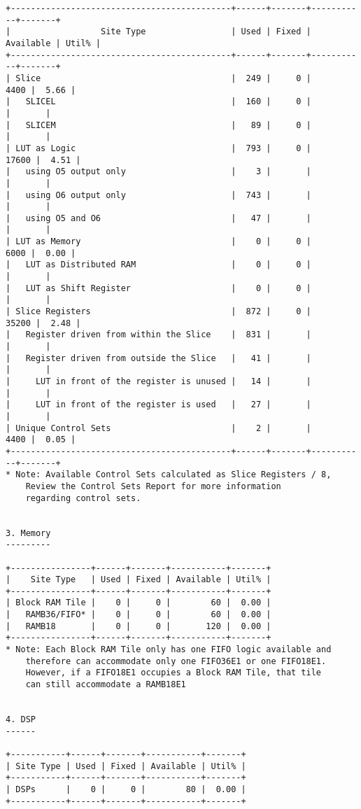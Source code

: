 \begin{Verbatim}[fontsize=\footnotesize,xleftmargin=-1cm]
+--------------------------------------------+------+-------+-----------+-------+
|                  Site Type                 | Used | Fixed | Available | Util% |
+--------------------------------------------+------+-------+-----------+-------+
| Slice                                      |  249 |     0 |      4400 |  5.66 |
|   SLICEL                                   |  160 |     0 |           |       |
|   SLICEM                                   |   89 |     0 |           |       |
| LUT as Logic                               |  793 |     0 |     17600 |  4.51 |
|   using O5 output only                     |    3 |       |           |       |
|   using O6 output only                     |  743 |       |           |       |
|   using O5 and O6                          |   47 |       |           |       |
| LUT as Memory                              |    0 |     0 |      6000 |  0.00 |
|   LUT as Distributed RAM                   |    0 |     0 |           |       |
|   LUT as Shift Register                    |    0 |     0 |           |       |
| Slice Registers                            |  872 |     0 |     35200 |  2.48 |
|   Register driven from within the Slice    |  831 |       |           |       |
|   Register driven from outside the Slice   |   41 |       |           |       |
|     LUT in front of the register is unused |   14 |       |           |       |
|     LUT in front of the register is used   |   27 |       |           |       |
| Unique Control Sets                        |    2 |       |      4400 |  0.05 |
+--------------------------------------------+------+-------+-----------+-------+
* Note: Available Control Sets calculated as Slice Registers / 8,
	Review the Control Sets Report for more information
	regarding control sets.


3. Memory
---------

+----------------+------+-------+-----------+-------+
|    Site Type   | Used | Fixed | Available | Util% |
+----------------+------+-------+-----------+-------+
| Block RAM Tile |    0 |     0 |        60 |  0.00 |
|   RAMB36/FIFO* |    0 |     0 |        60 |  0.00 |
|   RAMB18       |    0 |     0 |       120 |  0.00 |
+----------------+------+-------+-----------+-------+
* Note: Each Block RAM Tile only has one FIFO logic available and
	therefore can accommodate only one FIFO36E1 or one FIFO18E1.
	However, if a FIFO18E1 occupies a Block RAM Tile, that tile
	can still accommodate a RAMB18E1


4. DSP
------

+-----------+------+-------+-----------+-------+
| Site Type | Used | Fixed | Available | Util% |
+-----------+------+-------+-----------+-------+
| DSPs      |    0 |     0 |        80 |  0.00 |
+-----------+------+-------+-----------+-------+



\end{Verbatim}
